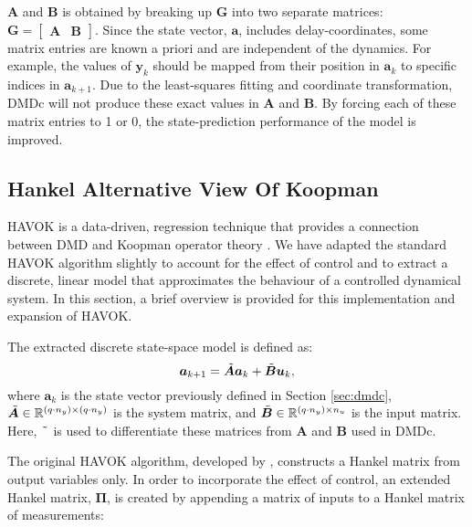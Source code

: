     $\bm{A}$ and $\bm{B}$ is obtained by breaking up $\bm{G}$ into two separate matrices:
    \(
        \bm{G} = \begin{bmatrix} \bm{A} & \bm{B} \end{bmatrix}.
    \)
    Since the state vector, $\bm{a}$, includes delay-coordinates, some matrix entries are known a priori and are independent of the dynamics. For example, the values of $\bm{y}_{k}$ should be mapped from their position in $\bm{a}_k$ to specific indices in $\bm{a}_{k+1}$. Due to the least-squares fitting and coordinate transformation, DMDc will not produce these exact values in $\bm{A}$ and $\bm{B}$. By forcing each of these matrix entries to 1 or 0, the state-prediction performance of the model is improved.
    \subsection{Hankel Alternative View Of Koopman}
% 
    \par
    HAVOK is a data-driven, regression technique that provides a connection between DMD and Koopman operator theory \cite{Brunton2017, Champion2019}. 
    We have adapted the standard HAVOK algorithm slightly to account for the effect of control and to extract a discrete, linear model that approximates the behaviour of a controlled dynamical system.
    In this section, a brief overview is provided for this implementation and expansion of \mbox{HAVOK}.
    \par
    The extracted discrete state-space model is defined as:
    \begin{equation} \label{eq:havoc_state_space}
        \bm{a}_{k+1} = \Tilde{\bm{A}} \bm{a}_k + \Tilde{\bm{B}} \bm{u}_k ,
    \end{equation}
    where $\bm{a}_k$ is the state vector previously defined in Section \ref{sec:dmdc}, 
    \( \Tilde{\bm{A}} \in \mathbb{R}^{(q \cdot n_y) \times (q \cdot n_y)} \) is the system matrix, 
    and \( \Tilde{\bm{B}} \in \mathbb{R}^{(q \cdot n_y) \times n_u} \) is the input matrix. 
    Here, $\Tilde{\phantom{a}}$ is used to differentiate these matrices from $\bm{A}$ and $\bm{B}$ used in DMDc.
    \par
    The original HAVOK algorithm, developed by \cite{Brunton2017}, constructs a Hankel matrix from output variables only. 
    In order to incorporate the effect of control, an extended Hankel matrix, $\bm{\Pi}$, is created by appending a matrix of inputs to a Hankel matrix of measurements:
